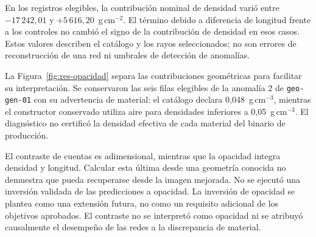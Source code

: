 En los registros elegibles, la contribución nominal de densidad varió entre $-17\,242{,}01$ y $+5\,616{,}20$~g\,cm$^{-2}$. El término debido a diferencia de longitud frente a los controles no cambió el signo de la contribución de densidad en esos casos. Estos valores describen el catálogo y los rayos seleccionados; no son errores de reconstrucción de una red ni umbrales de detección de anomalías.

La Figura~\ref{fig:res-opacidad} separa las contribuciones geométricas para facilitar su interpretación. Se conservaron las seis filas elegibles de la anomalía 2 de \texttt{geo-gen-01} con su advertencia de material: el catálogo declara 0,048~g\,cm$^{-3}$, mientras el constructor conservado utiliza aire para densidades inferiores a 0,05~g\,cm$^{-3}$. El diagnóstico no certificó la densidad efectiva de cada material del binario de producción.

El contraste de cuentas es adimensional, mientras que la opacidad integra densidad y longitud. Calcular esta última desde una geometría conocida no demuestra que pueda recuperarse desde la imagen mejorada. No se ejecutó una inversión validada de las predicciones a opacidad. La inversión de opacidad se plantea como una extensión futura, no como un requisito adicional de los objetivos aprobados. El contraste no se interpretó como opacidad ni se atribuyó causalmente el desempeño de las redes a la discrepancia de material.


